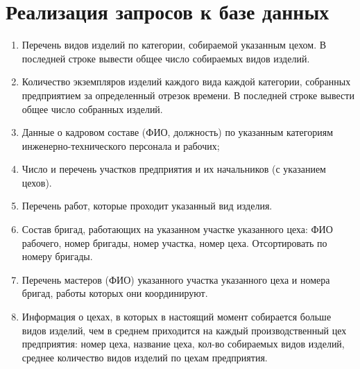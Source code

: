 \section{Реализация запросов к базе данных}
\begin{enumerate}

    \item Перечень видов изделий по категории, собираемой указанным цехом.
    В последней строке вывести общее число собираемых видов изделий.

    

    \item Количество экземпляров изделий каждого вида каждой категории, собранных предприятием за определенный отрезок времени.
    В последней строке вывести общее число собранных изделий.

    

    \item Данные о кадровом составе (ФИО, должность) по указанным категориям инженерно-технического персонала и рабочих;

    

    \item Число и перечень участков предприятия и их начальников (с указанием цехов).

    

    \item Перечень работ, которые проходит указанный вид изделия.

    

    \item Состав бригад, работающих на указанном участке указанного цеха: ФИО рабочего, номер бригады, номер участка, номер цеха. Отсортировать по номеру бригады.

    

    \item Перечень мастеров (ФИО) указанного участка указанного цеха и номера бригад, работы которых они координируют.

    

    \item Информация о цехах, в которых в настоящий момент собирается больше видов изделий, чем в среднем приходится на каждый производственный цех предприятия: номер цеха, название цеха, кол-во собираемых видов изделий, среднее количество видов изделий по цехам предприятия.


\end{enumerate}
